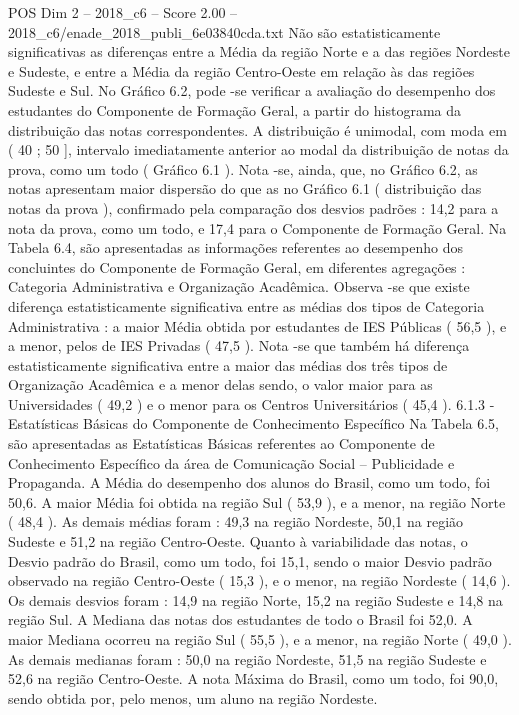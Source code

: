 \begin{textsample}{POS Dim 2 – 2018\_c6 – Score 2.00 – 2018\_c6/enade\_2018\_publi\_6e03840cda.txt}
Não são estatisticamente significativas as diferenças entre a Média da região Norte e a das regiões Nordeste e Sudeste, e entre a Média da região Centro-Oeste em relação às das regiões Sudeste e Sul.
No Gráfico 6.2, pode -se verificar a avaliação do desempenho dos estudantes do Componente de Formação Geral, a partir do histograma da distribuição das notas correspondentes.
A distribuição é unimodal, com moda em ( 40 ; 50 ], intervalo imediatamente anterior ao modal da distribuição de notas da prova, como um todo ( Gráfico 6.1 ).
Nota -se, ainda, que, no Gráfico 6.2, as notas apresentam maior dispersão do que as no Gráfico 6.1 ( distribuição das notas da prova ), confirmado pela comparação dos desvios padrões : 14,2 para a nota da prova, como um todo, e 17,4 para o Componente de Formação Geral.
Na Tabela 6.4, são apresentadas as informações referentes ao desempenho dos concluintes do Componente de Formação Geral, em diferentes agregações : Categoria Administrativa e Organização Acadêmica.
Observa -se que existe diferença estatisticamente significativa entre as médias dos tipos de Categoria Administrativa : a maior Média obtida por estudantes de IES Públicas ( 56,5 ), e a menor, pelos de IES Privadas ( 47,5 ).
Nota -se que também há diferença estatisticamente significativa entre a maior das médias dos três tipos de Organização Acadêmica e a menor delas sendo, o valor maior para as Universidades ( 49,2 ) e o menor para os Centros Universitários ( 45,4 ). 6.1.3 - Estatísticas Básicas do Componente de Conhecimento Específico Na Tabela 6.5, são apresentadas as Estatísticas Básicas referentes ao Componente de Conhecimento Específico da área de Comunicação Social – Publicidade e Propaganda.
A Média do desempenho dos alunos do Brasil, como um todo, foi 50,6.
A maior Média foi obtida na região Sul ( 53,9 ), e a menor, na região Norte ( 48,4 ).
As demais médias foram : 49,3 na região Nordeste, 50,1 na região Sudeste e 51,2 na região Centro-Oeste.
Quanto à variabilidade das notas, o Desvio padrão do Brasil, como um todo, foi 15,1, sendo o maior Desvio padrão observado na região Centro-Oeste ( 15,3 ), e o menor, na região Nordeste ( 14,6 ).
Os demais desvios foram : 14,9 na região Norte, 15,2 na região Sudeste e 14,8 na região Sul.
A Mediana das notas dos estudantes de todo o Brasil foi 52,0.
A maior Mediana ocorreu na região Sul ( 55,5 ), e a menor, na região Norte ( 49,0 ).
As demais medianas foram : 50,0 na região Nordeste, 51,5 na região Sudeste e 52,6 na região Centro-Oeste.
A nota Máxima do Brasil, como um todo, foi 90,0, sendo obtida por, pelo menos, um aluno na região Nordeste.

\end{textsample}
